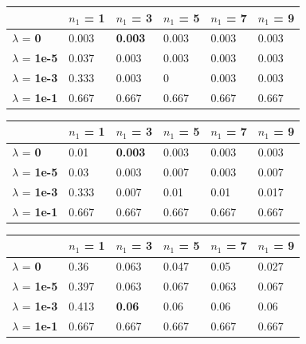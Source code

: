 \documentclass[10pt]{article}
\begin{document}
\begin{table}
\centering
\begin{tabular}{llllll}
\toprule
& $n_1$ = \bf{1} & $n_1$ =  \bf{3} & $n_1$ =  \bf{5} & $n_1$ =  \bf{7} & $n_1$ =  \bf{9} \\
\midrule
$\lambda$ = \bf{0} &       0.003 & \bf{0.003} & 0.003 & 0.003 & 0.003 \\
$\lambda$ = \bf{1e-5} &   0.037 & 0.003 & 0.003 & 0.003 & 0.003 \\
$\lambda$ = \bf{1e-3} &   0.333 & 0.003 & 0     & 0.003 & 0.003 \\
$\lambda$ = \bf{1e-1} &   0.667 & 0.667 & 0.667 & 0.667 & 0.667 \\
\bottomrule
\end{tabular}
\end{table}
	
\begin{table}
\centering
\begin{tabular}{llllll}
\toprule
& $n_1$ = \bf{1} & $n_1$ =  \bf{3} & $n_1$ =  \bf{5} & $n_1$ =  \bf{7} & $n_1$ =  \bf{9} \\
\midrule
$\lambda$ = \bf{0} &        0.01  & \bf{0.003} & 0.003 & 0.003 & 0.003 \\
$\lambda$ = \bf{1e-5} &    0.03  & 0.003 & 0.007 & 0.003 & 0.007 \\
$\lambda$ = \bf{1e-3} &    0.333 & 0.007 & 0.01  & 0.01  & 0.017 \\
$\lambda$ = \bf{1e-1} &    0.667 & 0.667 & 0.667 & 0.667 & 0.667 \\
\bottomrule
\end{tabular}
\end{table}


\begin{table}
\centering
\begin{tabular}{llllll}
\toprule
& $n_1$ = \bf{1} & $n_1$ =  \bf{3} & $n_1$ =  \bf{5} & $n_1$ =  \bf{7} & $n_1$ =  \bf{9} \\
\midrule
$\lambda$ = \bf{0} &  0.36  & 0.063 & 0.047 & 0.05  & 0.027 \\
$\lambda$ = \bf{1e-5} & 0.397 & 0.063 & 0.067 & 0.063 & 0.067 \\
$\lambda$ = \bf{1e-3} & 0.413 & \bf{0.06}  & 0.06  & 0.06  & 0.06  \\
$\lambda$ = \bf{1e-1} & 0.667 & 0.667 & 0.667 & 0.667 & 0.667 \\
\bottomrule
\end{tabular}
\end{table}
\end{document}
